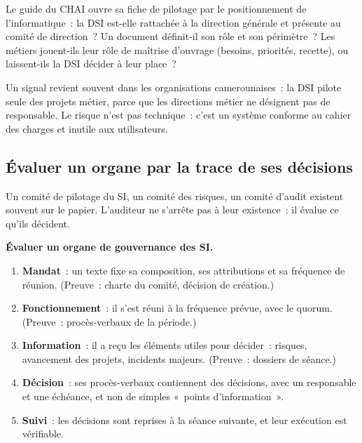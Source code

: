 Le guide du CHAI ouvre sa fiche de pilotage par le positionnement de
l'informatique~: la DSI est-elle rattachée à la direction générale et
présente au comité de direction~? Un document définit-il son rôle et son
périmètre~? Les métiers jouent-ils leur rôle de maîtrise d'ouvrage
(besoins, priorités, recette), ou laissent-ils la DSI décider à leur
place~?

Un signal revient souvent dans les organisations camerounaises~: la DSI
pilote seule des projets métier, parce que les directions métier ne
désignent pas de responsable. Le risque n'est pas technique~: c'est un
système conforme au cahier des charges et inutile aux utilisateurs.

\subsection{Évaluer un organe par la trace de ses décisions}

Un comité de pilotage du SI, un comité des risques, un comité d'audit
existent souvent sur le papier. L'auditeur ne s'arrête pas à leur
existence~: il évalue ce qu'ils décident.

\begin{boxprocedure}
\textbf{Évaluer un organe de gouvernance des SI.}
\begin{enumerate}
    \item \textbf{Mandat}~: un texte fixe sa composition, ses attributions et
          sa fréquence de réunion. (Preuve~: charte du comité, décision
          de création.)
    \item \textbf{Fonctionnement}~: il s'est réuni à la fréquence prévue,
          avec le quorum. (Preuve~: procès-verbaux de la période.)
    \item \textbf{Information}~: il a reçu les éléments utiles pour décider~:
          risques, avancement des projets, incidents majeurs. (Preuve~:
          dossiers de séance.)
    \item \textbf{Décision}~: ses procès-verbaux contiennent des décisions,
          avec un responsable et une échéance, et non de simples «~points
          d'information~».
    \item \textbf{Suivi}~: les décisions sont reprises à la séance
          suivante, et leur exécution est vérifiable.
\end{enumerate}
\end{boxprocedure}

